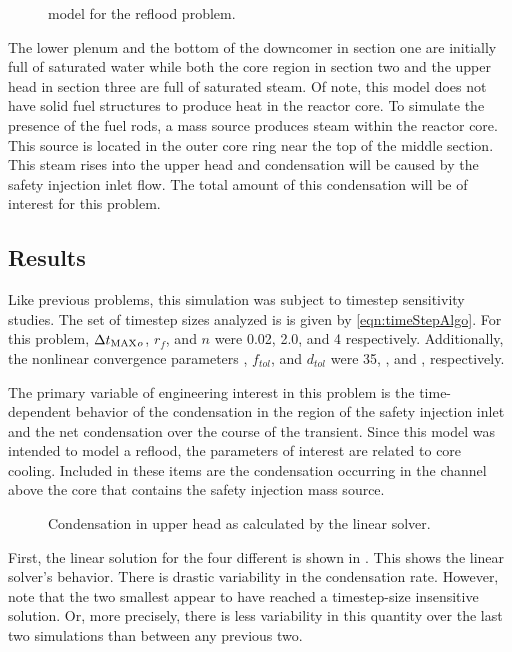\begin{figure}[h!tb]
\centering

\caption{\cobra{} model for the reflood problem.}
\label{fig:refloodModel}
\end{figure}

The lower plenum and the bottom of the downcomer in section one are initially full of saturated water while both the core region in section two and the upper head in section three are full of saturated steam.
Of note, this model does not have solid fuel structures to produce heat in the reactor core.
To simulate the presence of the fuel rods, a mass source produces steam within the reactor core.
This source is located in the outer core ring near the top of the middle section.
This steam rises into the upper head and condensation will be caused by the safety injection inlet flow.
The total amount of this condensation will be of interest for this problem.

\subsection{Results}
\label{sect:refloodResults}

Like previous problems, this simulation was subject to timestep sensitivity studies.
The set of timestep sizes analyzed is is given by \eqref{eqn:timeStepAlgo}.
For this problem, $\dtmax{}_{o}$, $r_{f}$, and ${n}$ were 0.02, 2.0, and 4 respectively.
Additionally, the nonlinear convergence parameters \kmax{}, $f_{tol}$, and $d_{tol}$ were 35, , and , respectively.

The primary variable of engineering interest in this problem is the time-dependent behavior of the condensation in the region of the safety injection inlet and the net condensation over the course of the transient.
Since this model was intended to model a reflood, the parameters of interest are related to core cooling.
Included in these items are the condensation occurring in the channel above the core that contains the safety injection mass source.

\begin{figure}[h!tb]
\centering

\caption{Condensation in upper head as calculated by the linear solver.}
\label{fig:refloodGammaLin}
\end{figure}

First, the linear solution for the four different \dtmax{} is shown in .
This shows the linear solver's behavior.
There is drastic variability in the condensation rate.
However, note that the two smallest \dtmax{} appear to have reached a timestep-size insensitive solution.
Or, more precisely, there is less variability in this quantity over the last two simulations than between any previous two.

